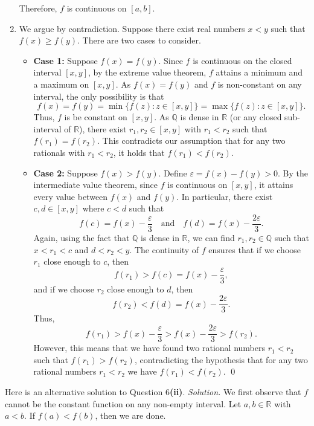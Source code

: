 \documentclass[11pt]{amsart}
\theoremstyle{plain}
\numberwithin{equation}{section}
\begin{document}
\begin{enumerate}[label=\textbf{(\roman*)}]
\begin{itemize}
    \end{itemize}
Therefore, $f$ is continuous on $[a,b]$.
\item We argue by contradiction. Suppose there exist real numbers \(x<y\) such that \(f\left(x\right)\ge f\left(y\right)\). There are two cases to consider.
\begin{itemize}
    \itemsep 0em
    \item \textbf{Case 1:} Suppose $f\left(x\right)=f\left(y\right)$. Since \(f\) is continuous on the closed interval \([x,y]\), by the extreme value theorem, $f$ attains a minimum and a maximum on \([x,y]\). As \(f(x)=f(y)\) and \(f\) is non-constant on any interval, the only possibility is that 
\[
f(x)=f(y)=\min\{f(z):z\in[x,y]\}=\max\{f(z):z\in[x,y]\}.
\]
Thus, \(f\) is be constant on \([x,y]\). As $\mathbb{Q}$ is dense in $\mathbb{R}$ (or any closed sub-interval of $\mathbb{R}$), there exist $r_1,r_2\in \left[x,y\right]$ with $r_1<r_2$ such that $f\left(r_1\right)=f\left(r_2\right)$. This contradicts our assumption that for any two rationals with \(r_1<r_2\), it holds that \(f(r_1)<f(r_2)\). 
\item \textbf{Case 2:} Suppose \(f(x) > f(y)\). Define $\varepsilon=f\left(x\right)-f\left(y\right)>0$. By the intermediate value theorem, since \(f\) is continuous on \([x,y]\), it attains every value between \(f(x)\) and \(f(y)\). In particular, there exist $c,d\in \left[x,y\right]$ where $c<d$ such that
\[
f(c) = f(x)-\frac{\varepsilon}{3} \quad \text{and} \quad f(d) = f(x)-\frac{2\varepsilon}{3}.
\]
Again, using the fact that $\mathbb{Q}$ is dense in $\mathbb{R}$, we can find $r_1,r_2\in\mathbb{Q}$ such that $x<r_1<c$ and $d<r_2<y$. The continuity of \(f\) ensures that if we choose \(r_1\) close enough to \(c\), then
\[
f(r_1) > f(c) = f(x)-\frac{\varepsilon}{3},
\]
and if we choose \(r_2\) close enough to \(d\), then
\[
f(r_2) < f(d) = f(x)-\frac{2\varepsilon}{3}.
\]
Thus,
\[
f(r_1) > f(x)-\frac{\varepsilon}{3} > f(x)-\frac{2\varepsilon}{3} > f(r_2).
\]
However, this means that we have found two rational numbers \(r_1<r_2\) such that $f\left(r_1\right)>f\left(r_2\right)$, contradicting the hypothesis that for any two rational numbers \(r_1<r_2\) we have $f\left(r_1\right)<f\left(r_2\right)$. \qed 
\end{itemize}
\end{enumerate}
\noindent Here is an alternative solution to Question 6\textbf{(ii)}.
\newline\textit{Solution.} We first observe that $f$ cannot be the constant function on any non-empty interval. Let $a,b\in\mathbb{R}$ with $a<b$. If $f(a)<f(b)$, then we are done.
\end{document}
